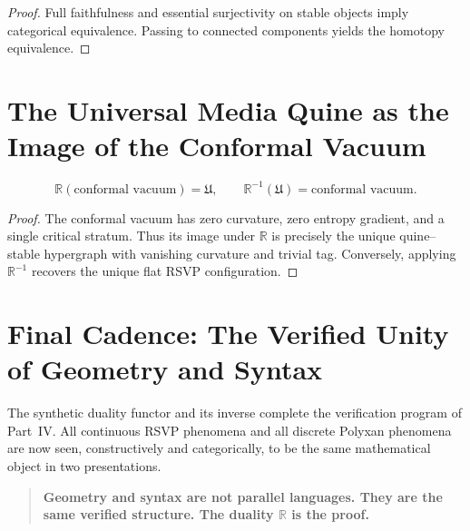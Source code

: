 \begin{proof}
Full faithfulness and essential surjectivity on stable objects
imply categorical equivalence.
Passing to connected components yields the homotopy equivalence.
\end{proof}

\section{The Universal Media Quine as the Image of the Conformal Vacuum}

\begin{theorem}
\[
\mathbb{R}(\text{conformal vacuum}) = \mathfrak{U},
\qquad
\mathbb{R}^{-1}(\mathfrak{U}) = \text{conformal vacuum}.
\]
\end{theorem}

\begin{proof}
The conformal vacuum has zero curvature, zero entropy gradient, and a single critical stratum.
Thus its image under $\mathbb{R}$ is precisely the unique quine--stable hypergraph
with vanishing curvature and trivial tag.
Conversely, applying $\mathbb{R}^{-1}$ recovers the unique flat RSVP configuration.
\end{proof}

\section{Final Cadence: The Verified Unity of Geometry and Syntax}

The synthetic duality functor and its inverse complete the verification program of Part~IV.
All continuous RSVP phenomena and all discrete Polyxan phenomena
are now seen, constructively and categorically,
to be the same mathematical object in two presentations.

\begin{quote}
\textbf{
Geometry and syntax are not parallel languages.  
They are the same verified structure.  
The duality $\mathbb{R}$ is the proof.
}
\end{quote}

